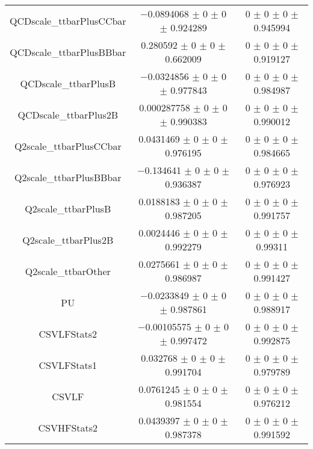 \begin{table}
\begin{tabular}{ccc}
QCDscale\_ttbarPlusCCbar & \num{-0.0894068} $\pm$ \num{0} $\pm$ \num{0} $\pm$ \num{0.924289} & \num{0} $\pm$ \num{0} $\pm$ \num{0} $\pm$ \num{0.945994}\\
QCDscale\_ttbarPlusBBbar & \num{0.280592} $\pm$ \num{0} $\pm$ \num{0} $\pm$ \num{0.662009} & \num{0} $\pm$ \num{0} $\pm$ \num{0} $\pm$ \num{0.919127}\\
QCDscale\_ttbarPlusB & \num{-0.0324856} $\pm$ \num{0} $\pm$ \num{0} $\pm$ \num{0.977843} & \num{0} $\pm$ \num{0} $\pm$ \num{0} $\pm$ \num{0.984987}\\
QCDscale\_ttbarPlus2B & \num{0.000287758} $\pm$ \num{0} $\pm$ \num{0} $\pm$ \num{0.990383} & \num{0} $\pm$ \num{0} $\pm$ \num{0} $\pm$ \num{0.990012}\\
Q2scale\_ttbarPlusCCbar & \num{0.0431469} $\pm$ \num{0} $\pm$ \num{0} $\pm$ \num{0.976195} & \num{0} $\pm$ \num{0} $\pm$ \num{0} $\pm$ \num{0.984665}\\
Q2scale\_ttbarPlusBBbar & \num{-0.134641} $\pm$ \num{0} $\pm$ \num{0} $\pm$ \num{0.936387} & \num{0} $\pm$ \num{0} $\pm$ \num{0} $\pm$ \num{0.976923}\\
Q2scale\_ttbarPlusB & \num{0.0188183} $\pm$ \num{0} $\pm$ \num{0} $\pm$ \num{0.987205} & \num{0} $\pm$ \num{0} $\pm$ \num{0} $\pm$ \num{0.991757}\\
Q2scale\_ttbarPlus2B & \num{0.0024446} $\pm$ \num{0} $\pm$ \num{0} $\pm$ \num{0.992279} & \num{0} $\pm$ \num{0} $\pm$ \num{0} $\pm$ \num{0.99311}\\
Q2scale\_ttbarOther & \num{0.0275661} $\pm$ \num{0} $\pm$ \num{0} $\pm$ \num{0.986987} & \num{0} $\pm$ \num{0} $\pm$ \num{0} $\pm$ \num{0.991427}\\
PU & \num{-0.0233849} $\pm$ \num{0} $\pm$ \num{0} $\pm$ \num{0.987861} & \num{0} $\pm$ \num{0} $\pm$ \num{0} $\pm$ \num{0.988917}\\
CSVLFStats2 & \num{-0.00105575} $\pm$ \num{0} $\pm$ \num{0} $\pm$ \num{0.997472} & \num{0} $\pm$ \num{0} $\pm$ \num{0} $\pm$ \num{0.992875}\\
CSVLFStats1 & \num{0.032768} $\pm$ \num{0} $\pm$ \num{0} $\pm$ \num{0.991704} & \num{0} $\pm$ \num{0} $\pm$ \num{0} $\pm$ \num{0.979789}\\
CSVLF & \num{0.0761245} $\pm$ \num{0} $\pm$ \num{0} $\pm$ \num{0.981554} & \num{0} $\pm$ \num{0} $\pm$ \num{0} $\pm$ \num{0.976212}\\
CSVHFStats2 & \num{0.0439397} $\pm$ \num{0} $\pm$ \num{0} $\pm$ \num{0.987378} & \num{0} $\pm$ \num{0} $\pm$ \num{0} $\pm$ \num{0.991592}\\

\end{tabular}
\end{table}
